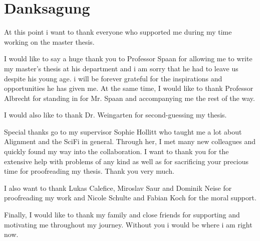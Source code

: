 \chapter*{Danksagung}

At this point i want to thank everyone who supported me during my time working
on the master thesis.

I would like to say a huge thank you to Professor Spaan for allowing me to write my master's thesis at his department and i am sorry that he had to leave us despite his young age.
i will be forever grateful for the inspirations and opportunities he has given me.
At the same time, I would like to thank Professor Albrecht for standing in for Mr. Spaan and accompanying me the rest of the way.

I would also like to thank Dr. Weingarten for second-guessing my thesis.

Special thanks go to my supervisor Sophie Hollitt who taught me a lot about Alignment and the SciFi in general. Through her, I met many new colleagues and quickly found my way into the collaboration.
I want to thank you for the extensive help with problems of any kind as well as for sacrificing your precious time for proofreading my thesis.
Thank you very much.

I also want to thank Lukas Calefice, Miroslav Saur and Dominik Neise for proofreading my work and Nicole Schulte and Fabian Koch for the moral support.

Finally, I would like to thank my family and close friends for supporting and motivating me throughout my journey. Without you i would be where i am right now.
